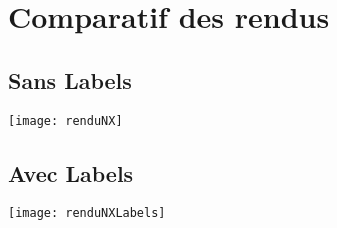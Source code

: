 \chapter{Comparatif des rendus}

	\section{Sans Labels}
	
\begin{center}

\texttt{[image: renduNX]}

\end{center}

	\section{Avec Labels}
	
\begin{center}

\texttt{[image: renduNXLabels]}

\end{center}